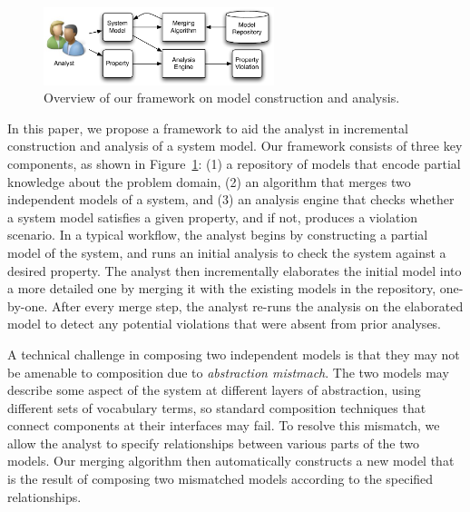 \begin{figure}[!t]
\centering
\includegraphics[width=0.60\textwidth]{diagrams/overview}
\caption{Overview of our framework on model construction and analysis.}
\label{fig-overview}
\end{figure}

In this paper, we propose a framework to aid the analyst in
incremental construction and analysis of a system model. Our framework
consists of three key components, as shown in
Figure~\ref{fig-overview}: (1) a repository of models that encode
partial knowledge about the problem domain, (2) an algorithm that
merges two independent models of a system, and (3) an analysis engine
that checks whether a system model satisfies a given property, and if
not, produces a violation scenario. In a typical workflow, the analyst
begins by constructing a partial model of the system, and runs an
initial analysis to check the system against a desired property. The
analyst then incrementally elaborates the initial model into a more
detailed one by merging it with the existing models in the repository,
one-by-one. After every merge step, the analyst re-runs the
analysis on the elaborated model to detect any potential violations
that were absent from prior analyses.

A technical challenge in composing two independent models is that they
may not be amenable to composition due to \textit{abstraction
  mistmach}. The two models may describe some aspect of the system at
different layers of abstraction, using different sets of vocabulary
terms, so standard composition techniques that connect components at
their interfaces may fail. To resolve this mismatch, we allow the
analyst to specify relationships between various parts of the two
models. Our merging algorithm then automatically constructs a new
model that is the result of composing two mismatched models according
to the specified relationships.

